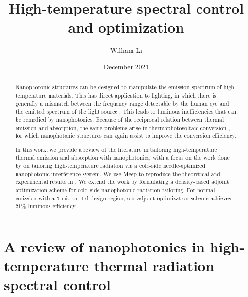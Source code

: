\documentclass[%
 reprint,
 amsmath,amssymb,
 aps
]{revtex4-2}
\begin{document}

\title{High-temperature spectral control and optimization}%

\author{William Li}



\date{December 2021}%

\begin{abstract}
Nanophotonic structures can be designed to manipulate the emission spectrum of high-temperature materials. This has direct application to lighting, in which there is generally a mismatch between the frequency range detectable by the human eye and the emitted spectrum of the light source \cite{DOE}. This leads to luminous inefficiencies that can be remedied by nanophotonics. Because of the reciprocal relation between thermal emission and absorption, the same problems arise in thermophotovoltaic conversion \cite{shockley}, for which nanophotonic structures can again assist to improve the conversion efficiency. 

In this work, we provide a review of the literature in tailoring high-temperature thermal emission and absorption with nanophotonics, with a focus on the work done by \cite{ilic} on tailoring high-temperature radiation via a cold-side needle-optimized nanophotonic interference system. We use Meep \cite{meep} to reproduce the theoretical and experimental results in \cite{ilic}. We extend the work by formulating a density-based adjoint optimization scheme \cite{adjoint} for cold-side nanophotonic radiation tailoring. For normal emission with a 5-micron 1-d design region, our adjoint optimization scheme achieves $21\%$ luminous efficiency.
\end{abstract}

\maketitle


\section{A review of nanophotonics in high-temperature thermal radiation spectral control}
\end{document}
